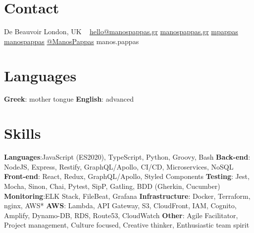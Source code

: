 
\newcommand*{\img}[1]{%
    \raisebox{-.1\baselineskip}{%
        \texttt{[image: \#1]}%
    }%
}


\begin{aside} %
\section{\normalfont Contact}
 De Beauvoir
London, UK
~
 \hspace{0.02cm} \myNumberUK
{} \hspace{0.02cm} \href{mailto:\myEmail}{hello@manospappas.gr}
 \hspace{0.02cm} \href{https://www.manospappas.gr/}{manospappas.gr}
 \hspace{0.02cm} \href{https://github.com/mpappas}{ mpappas}
 \hspace{0.02cm} \href{https://www.linkedin.com/in/manos-pappas}{ manospappas}
 \hspace{0.02cm} \href{https://twitter.com/ManoPappas}{ @ManosPappas}
\raisebox{-0.4ex}{\skype{}} manos.pappas
~

\section{\normalfont Languages}
\textbf{Greek}: mother tongue
\textbf{English}: advanced
~

\section{\normalfont Skills}
\textbf{Languages}:JavaScript (ES2020), TypeScript, Python, Groovy, Bash
\textbf{Back-end}: NodeJS, Express, Restify, GraphQL/Apollo, CI/CD, Microservices, NoSQL
\textbf{Front-end}: React, Redux, GraphQL/Apollo, Styled Components
\textbf{Testing}: Jest, Mocha, Sinon, Chai, Pytest, SipP, Gatling, BDD (Gherkin, Cucumber)
\textbf{Monitoring}:ELK Stack, FileBeat, Grafana
\textbf{Infrastructure}: Docker, Terraform, nginx, AWS*
\textbf{AWS}: Lambda, API Gateway, S3, CloudFront, IAM, Cognito, Amplify, Dynamo-DB, RDS, Route53, CloudWatch
\textbf{Other}: Agile Facilitator, Project management, Culture focused, Creative thinker, Enthusiastic team spirit
~
\vspace{-0.01cm}

\end{aside}
